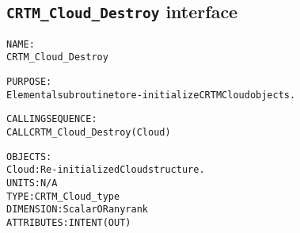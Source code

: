 \subsection{\texttt{CRTM\_Cloud\_Destroy} interface}
  \label{sec:CRTM_Cloud_Destroy_interface}
  \begin{alltt}
 
  NAME:
        CRTM_Cloud_Destroy
 
  PURPOSE:
        Elemental subroutine to re-initialize CRTM Cloud objects.
 
  CALLING SEQUENCE:
        CALL CRTM_Cloud_Destroy( Cloud )
 
  OBJECTS:
        Cloud:        Re-initialized Cloud structure.
                      UNITS:      N/A
                      TYPE:       CRTM_Cloud_type
                      DIMENSION:  Scalar OR any rank
                      ATTRIBUTES: INTENT(OUT)
 
  \end{alltt}
